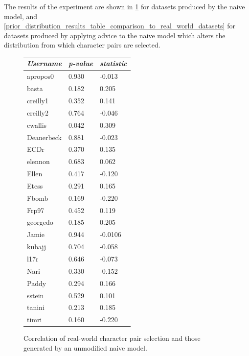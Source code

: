 The results of the experiment are shown in
\cref{naive_model_results_table_comparison_to_real_world_datasets} for datasets
produced by the naive model, and
\cref{prior_distribution_results_table_comparison_to_real_world_datasets} for
datasets produced by applying advice to the naive model which alters the
distribution from which character pairs are selected.

\begin{figure}[h]
  \centering
  
  \begin{minipage}{.45\textwidth}
    \centering
    \begin{tabular}{@{}l l l@{}}
      \toprule
      \emph{Username} & \emph{p-value} & \emph{\tau{} statistic} \\\midrule
    apropos0 & 0.930 & -0.013 \\
    basta & 0.182 & 0.205 \\
    creilly1 & 0.352 & 0.141 \\
    creilly2 & 0.764 & -0.046 \\
    cwallis & 0.042 & 0.309 \\
    Deanerbeck & 0.881 & -0.023 \\
    ECDr & 0.370 & 0.135 \\
    elennon & 0.683 & 0.062 \\
    Ellen & 0.417 & -0.120 \\
    Etess & 0.291 & 0.165 \\
    Fbomb & 0.169 & -0.220 \\
    Frp97 & 0.452 & 0.119 \\
    georgedo & 0.185 & 0.205 \\
    Jamie & 0.944 & -0.0106 \\
    kubajj & 0.704 & -0.058 \\
    l17r & 0.646 & -0.073 \\
    Nari & 0.330 & -0.152 \\
    Paddy & 0.294 & 0.166 \\
    sstein & 0.529 & 0.101 \\
    tanini & 0.213 & 0.185 \\
    timri & 0.160 & -0.220 \\
    \bottomrule
    \end{tabular}
    \caption{Correlation of real-world character pair selection and those generated by an unmodified naive model.}
    \label{naive_model_results_table_comparison_to_real_world_datasets}
  \end{minipage}\hfill

\end{figure}
